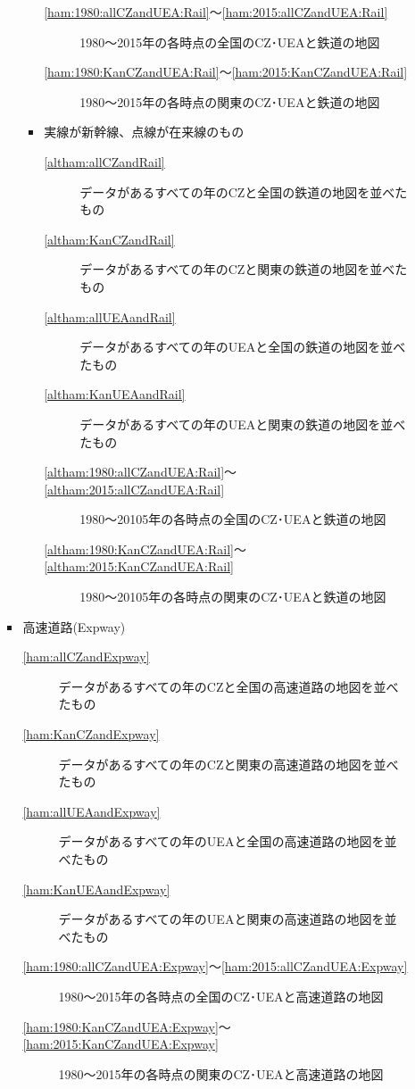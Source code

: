 \documentclass{ltjsarticle}
\begin{document}
\begin{itemize}
\begin{itemize}
\begin{itemize}
\begin{itemize}
\begin{description}
          \item[\ref{ham:1980:allCZandUEA:Rail}～\ref{ham:2015:allCZandUEA:Rail}] 1980～2015年の各時点の全国のCZ･UEAと鉄道の地図
          \item[\ref{ham:1980:KanCZandUEA:Rail}～\ref{ham:2015:KanCZandUEA:Rail}] 1980～2015年の各時点の関東のCZ･UEAと鉄道の地図
        \end{description}
        \item 実線が新幹線、点線が在来線のもの
        \begin{description}
          \item[\ref{altham:allCZandRail}] データがあるすべての年のCZと全国の鉄道の地図を並べたもの
          \item[\ref{altham:KanCZandRail}] データがあるすべての年のCZと関東の鉄道の地図を並べたもの
          \item[\ref{altham:allUEAandRail}] データがあるすべての年のUEAと全国の鉄道の地図を並べたもの
          \item[\ref{altham:KanUEAandRail}] データがあるすべての年のUEAと関東の鉄道の地図を並べたもの
          \item[\ref{altham:1980:allCZandUEA:Rail}～\ref{altham:2015:allCZandUEA:Rail}] 1980～20105年の各時点の全国のCZ･UEAと鉄道の地図
          \item[\ref{altham:1980:KanCZandUEA:Rail}～\ref{altham:2015:KanCZandUEA:Rail}] 1980～20105年の各時点の関東のCZ･UEAと鉄道の地図
        \end{description}
      \end{itemize}      
      \item 高速道路(Expway)
      \begin{description}
        \item[\ref{ham:allCZandExpway}] データがあるすべての年のCZと全国の高速道路の地図を並べたもの
        \item[\ref{ham:KanCZandExpway}] データがあるすべての年のCZと関東の高速道路の地図を並べたもの
        \item[\ref{ham:allUEAandExpway}] データがあるすべての年のUEAと全国の高速道路の地図を並べたもの
        \item[\ref{ham:KanUEAandExpway}] データがあるすべての年のUEAと関東の高速道路の地図を並べたもの
        \item[\ref{ham:1980:allCZandUEA:Expway}～\ref{ham:2015:allCZandUEA:Expway}] 1980～2015年の各時点の全国のCZ･UEAと高速道路の地図
        \item[\ref{ham:1980:KanCZandUEA:Expway}～\ref{ham:2015:KanCZandUEA:Expway}] 1980～2015年の各時点の関東のCZ･UEAと高速道路の地図
      \end{description}
    \end{itemize}

  \end{itemize}
\end{itemize}
\end{document}
